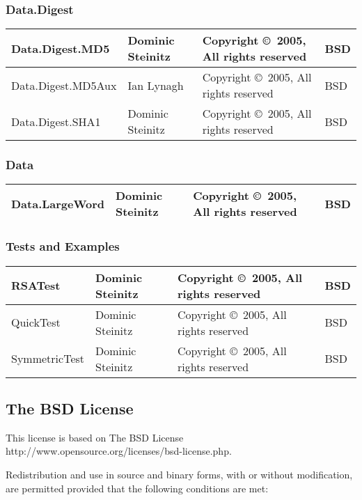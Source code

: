 \documentclass{article}
\begin{document}
\subsubsection{Data.Digest}
\begin{tabular}{|p{6cm}|p{3cm}|p{3cm}|p{1cm}|}
\hline\hline
Data.Digest.MD5 & Dominic Steinitz &
Copyright \copyright\ 2005, All rights reserved & BSD \\
\hline
Data.Digest.MD5Aux & Ian Lynagh &
Copyright \copyright\ 2005, All rights reserved & BSD \\
\hline
Data.Digest.SHA1 & Dominic Steinitz &
Copyright \copyright\ 2005, All rights reserved & BSD \\
\hline\hline
\end{tabular}

\subsubsection{Data}
\begin{tabular}{|p{6cm}|p{3cm}|p{3cm}|p{1cm}|}
\hline\hline
Data.LargeWord 
& Dominic Steinitz &
Copyright \copyright\ 2005, All rights reserved & BSD \\
\hline\hline
\end{tabular}

\subsubsection{Tests and Examples}
\begin{tabular}{|p{6cm}|p{3cm}|p{3cm}|p{1cm}|}
\hline\hline
RSATest
& Dominic Steinitz &
Copyright \copyright\ 2005, All rights reserved & BSD \\
\hline
QuickTest
& Dominic Steinitz &
Copyright \copyright\ 2005, All rights reserved & BSD \\
\hline
SymmetricTest
& Dominic Steinitz &
Copyright \copyright\ 2005, All rights reserved & BSD \\
\hline\hline
\end{tabular}

\subsection{The BSD License}

This license is based on
\htmladdnormallinkfoot
{The BSD License}
{http://www.opensource.org/licenses/bsd-license.php}.

Redistribution and use in source and binary forms, with or without 
modification, are permitted provided that the following conditions are met:
\end{document}
